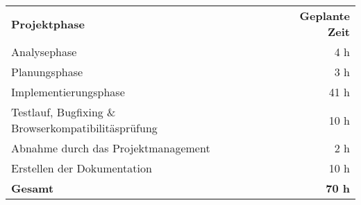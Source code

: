 \begin{tabular}{lr}
\rowcolor{heading}\textbf{Projektphase} & \textbf{Geplante Zeit} \\
Analysephase & 4 h \\
\rowcolor{odd}Planungsphase & 3 h \\
Implementierungsphase & 41 h \\
\rowcolor{odd}Testlauf, Bugfixing \& Browserkompatibilitäsprüfung & 10 h \\
Abnahme durch das Projektmanagement & 2 h \\
\rowcolor{odd}Erstellen der Dokumentation & 10 h \\

\hline
\hline
\rowcolor{odd}\textbf{Gesamt} & \textbf{70 h} \\
\end{tabular}
